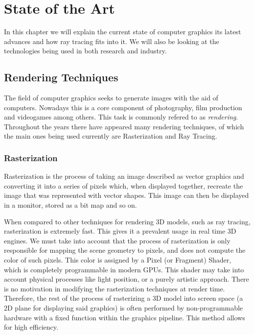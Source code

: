 \chapter{State of the Art}

In this chapter we will explain the current state of computer graphics its latest advances and how ray tracing fits into it. We will also be looking at the technologies being used in both research and industry. 

\section{Rendering Techniques}
The field of computer graphics seeks to generate images with the aid of computers. Nowadays this is a core component of photography, film production and videogames among others. This task is commonly refered to as \textit{rendering}. Throughout the years there have appeared many rendering techniques, of which the main ones being used currently are Rasterization and Ray Tracing.

\subsection{Rasterization}
Rasterization is the process of taking an image described as vector graphics and converting it into a series of pixels which, when displayed together, recreate the image that was represented with vector shapes. This image can then be displayed in a monitor, stored as a bit map and so on.

When compared to other techniques for rendering 3D models, such as ray tracing, rasterization is extremely fast. This gives it a prevalent usage in real time 3D engines. We must take into account that the process of rasterization is only responsible for mapping the scene geometry to pixels, and does not compute the color of such pixels. This color is assigned by a Pixel (or Fragment) Shader, which is completely programmable in modern GPUs. This shader may take into account physical processes like light position, or a purely artistic approach. There is no motivation in modifying the rasterization techniques at render time. Therefore, the rest of the process of rasterizing a 3D model into screen space (a 2D plane for displaying said graphics) is often performed by non-programmable hardware with a fixed function within the graphics pipeline. This method allows for high efficiency.

